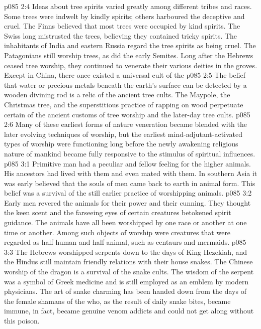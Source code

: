 \vs p085 2:4 Ideas about tree spirits varied greatly among different tribes and races. Some trees were indwelt by kindly spirits; others harboured the deceptive and cruel. The Finns believed that most trees were occupied by kind spirits. The Swiss long mistrusted the trees, believing they contained tricky spirits. The inhabitants of India and eastern Russia regard the tree spirits as being cruel. The Patagonians still worship trees, as did the early Semites. Long after the Hebrews ceased tree worship, they continued to venerate their various deities in the groves. Except in China, there once existed a universal cult of the 
\vs p085 2:5 The belief that water or precious metals beneath the earth’s surface can be detected by a wooden divining rod is a relic of the ancient tree cults. The Maypole, the Christmas tree, and the superstitious practice of rapping on wood perpetuate certain of the ancient customs of tree worship and the later\hyp{}day tree cults.
\vs p085 2:6 Many of these earliest forms of nature veneration became blended with the later evolving techniques of worship, but the earliest mind\hyp{}adjutant\hyp{}activated types of worship were functioning long before the newly awakening religious nature of mankind became fully responsive to the stimulus of spiritual influences.
\vs p085 3:1 Primitive man had a peculiar and fellow feeling for the higher animals. His ancestors had lived with them and even mated with them. In southern Asia it was early believed that the souls of men came back to earth in animal form. This belief was a survival of the still earlier practice of worshipping animals.
\vs p085 3:2 Early men revered the animals for their power and their cunning. They thought the keen scent and the farseeing eyes of certain creatures betokened spirit guidance. The animals have all been worshipped by one race or another at one time or another. Among such objects of worship were creatures that were regarded as half human and half animal, such as centaurs and mermaids.
\vs p085 3:3 The Hebrews worshipped serpents down to the days of King Hezekiah, and the Hindus still maintain friendly relations with their house snakes. The Chinese worship of the dragon is a survival of the snake cults. The wisdom of the serpent was a symbol of Greek medicine and is still employed as an emblem by modern physicians. The art of snake charming has been handed down from the days of the female shamans of the  who, as the result of daily snake bites, became immune, in fact, became genuine venom addicts and could not get along without this poison.
